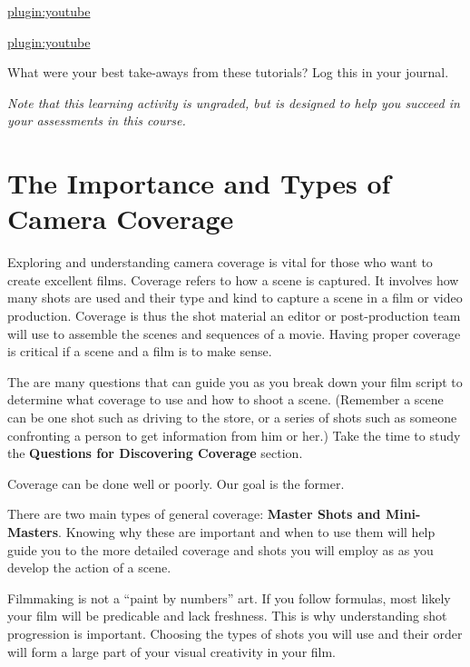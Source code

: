\documentclass[
]{book}
\begin{document}
\href{https://www.youtube.com/watch?v=IK2IAEO-FUI}{plugin:youtube}

\href{https://www.youtube.com/watch?v=9AGaECt9j4g}{plugin:youtube}

What were your best take-aways from these tutorials? Log this in your journal.

\emph{Note that this learning activity is ungraded, but is designed to help you succeed in your assessments in this course.}

\hypertarget{the-importance-and-types-of-camera-coverage}{%
\section*{The Importance and Types of Camera Coverage}\label{the-importance-and-types-of-camera-coverage}}

Exploring and understanding camera coverage is vital for those who want to create excellent films. Coverage refers to how a scene is captured. It involves how many shots are used and their type and kind to capture a scene in a film or video production. Coverage is thus the shot material an editor or post-production team will use to assemble the scenes and sequences of a movie. Having proper coverage is critical if a scene and a film is to make sense.

The are many questions that can guide you as you break down your film script to determine what coverage to use and how to shoot a scene. (Remember a scene can be one shot such as driving to the store, or a series of shots such as someone confronting a person to get information from him or her.) Take the time to study the \textbf{Questions for Discovering Coverage} section.

Coverage can be done well or poorly. Our goal is the former.

There are two main types of general coverage: \textbf{Master Shots and Mini-Masters}. Knowing why these are important and when to use them will help guide you to the more detailed coverage and shots you will employ as as you develop the action of a scene.

Filmmaking is not a ``paint by numbers'' art. If you follow formulas, most likely your film will be predicable and lack freshness. This is why understanding shot progression is important. Choosing the types of shots you will use and their order will form a large part of your visual creativity in your film.
\end{document}
